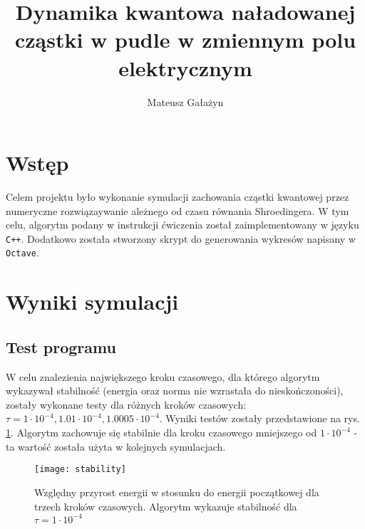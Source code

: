 \documentclass[a4paper,10pt]{article}
\author{Mateusz Gałażyn}
\title{Dynamika kwantowa naładowanej cząstki w pudle w zmiennym polu elektrycznym}
\begin{document}
	\maketitle
	\section{Wstęp}
	Celem projektu było wykonanie symulacji zachowania cząstki kwantowej przez numeryczne rozwiązaywanie ależnego od czasu równania Shroedingera. W tym celu, algorytm podany w instrukcji ćwiczenia został zaimplementowany w języku \verb|C++|. Dodatkowo została stworzony skrypt do generowania wykresów napisany w \verb|Octave|.
	\section{Wyniki symulacji}
	\subsection{Test programu}
	W celu znalezienia największego kroku czasowego, dla którego algorytm wykazywał stabilność (energia oraz norma nie wzrastała do nieskończoności), zostały wykonane testy dla różnych kroków czasowych: $\tau = 1 \cdot 10^{-4},1.01 \cdot 10^{-4}, 1.0005 \cdot 10^{-4}$. Wyniki testów zostały przedstawione na rys. \ref{performance}. Algorytm zachowuje się stabilnie dla kroku czasowego mniejszego od $1 \cdot 10^{-4}$ - ta wartość została użyta w kolejnych symulacjach.
	\begin{figure}[h]
	    \centering
	    \texttt{[image: stability]}
	    \caption{Względny przyrost energii w stosunku do energii początkowej dla trzech kroków czasowych. Algorytm wykazuje stabilność dla $\tau=1 \cdot 10^{-4}$}
		\label{performance}
	\end{figure}
	\clearpage	
\end{document}
